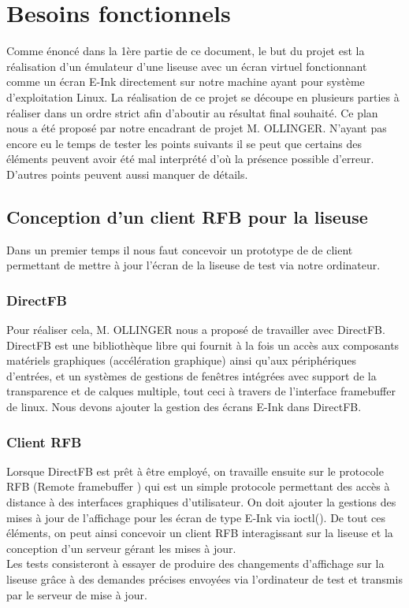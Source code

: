 \chapter{Besoins fonctionnels}

Comme énoncé dans la 1ère partie de ce document, le but du projet est la réalisation d'un émulateur d'une liseuse avec un écran virtuel fonctionnant comme un écran E-Ink directement sur notre machine ayant pour système d'exploitation Linux. La réalisation de ce projet se découpe en plusieurs parties à réaliser dans un ordre strict afin d'aboutir au résultat final souhaité. Ce plan nous a été proposé par notre encadrant de projet M. OLLINGER. N'ayant pas encore eu le temps de tester les points suivants il se peut que certains des éléments peuvent avoir été mal interprété d'où la présence possible d'erreur. D'autres points peuvent aussi manquer de détails.

\section{Conception d'un client RFB pour la liseuse}

Dans un premier temps il nous faut concevoir un prototype de de client permettant de mettre à jour l'écran de la liseuse de test via notre ordinateur.

\subsection{DirectFB}
Pour réaliser cela, M. OLLINGER nous a proposé de travailler avec DirectFB. DirectFB est une bibliothèque libre qui fournit à la fois un accès aux composants matériels graphiques (accélération graphique) ainsi qu'aux périphériques d'entrées, et un systèmes de gestions de fenêtres intégrées avec support de la transparence et de calques multiple, tout ceci à travers de l'interface framebuffer de linux. Nous devons ajouter la gestion des écrans E-Ink dans DirectFB. 
 
\subsection{Client RFB}
Lorsque DirectFB est prêt à être employé, on travaille ensuite sur le protocole RFB (Remote framebuffer ) qui est un simple protocole permettant des accès à distance à des interfaces graphiques d'utilisateur. On doit ajouter la gestions des mises à jour de l'affichage pour les écran de type E-Ink via ioctl(). De tout ces éléments, on peut ainsi concevoir un client RFB interagissant sur la liseuse et la conception d'un serveur gérant les mises à jour.
\\Les tests consisteront à essayer de produire des changements d'affichage sur la liseuse grâce à des demandes précises envoyées via l'ordinateur de test et transmis par le serveur de mise à jour. 

